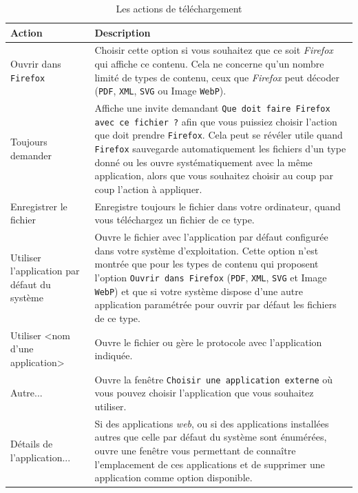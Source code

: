 \documentclass[a4paper,11pt]{book}
\begin{document}
\begin{table}[!h]
\begin{center}
\begin{tabular}{|p{2.5cm}|p{9.5cm}|}
\hline
\textbf{Action} & \textbf{Description} \\
\hline
Ouvrir dans \texttt{Firefox} & Choisir cette option si vous souhaitez que ce soit \textit{Firefox} qui affiche ce contenu. Cela ne concerne qu’un nombre limité de types de contenu, ceux que \textit{Firefox} peut décoder (\texttt{PDF}, \texttt{XML}, \texttt{SVG} ou Image \texttt{WebP}).\\
\hline
Toujours demander & Affiche une invite demandant \texttt{Que doit faire Firefox avec ce fichier ?} afin que vous puissiez choisir l’action que doit prendre \texttt{Firefox}. Cela peut se révéler utile quand \texttt{Firefox} sauvegarde automatiquement les fichiers d’un type donné ou les ouvre systématiquement avec la même application, alors que vous souhaitez choisir au coup par coup l’action à appliquer.\\
\hline
Enregistrer le fichier & Enregistre toujours le fichier dans votre ordinateur, quand vous téléchargez un fichier de ce type.\\
\hline
Utiliser l’application par défaut du système & Ouvre le fichier avec l’application par défaut configurée dans votre système d’exploitation. Cette option n’est montrée que pour les types de contenu qui proposent l’option \texttt{Ouvrir dans Firefox} (\texttt{PDF}, \texttt{XML}, \texttt{SVG} et Image \texttt{WebP}) et que si votre système dispose d’une autre application paramétrée pour ouvrir par défaut les fichiers de ce type.\\
\hline
Utiliser <nom d’une application> & Ouvre le fichier ou gère le protocole avec l’application indiquée.\\
\hline
Autre... & Ouvre la fenêtre \texttt{Choisir une application externe} où vous pouvez choisir l’application que vous souhaitez utiliser.\\
\hline
Détails de l’application... & Si des applications \textit{web}, ou si des applications installées autres que celle par défaut du système sont énumérées, ouvre une fenêtre vous permettant de connaître l’emplacement de ces applications et de supprimer une application comme option disponible.\\
\hline 
\end{tabular}
\caption{Les actions de téléchargement}
\end{center}
\end{table}
\medskip
\end{document}
